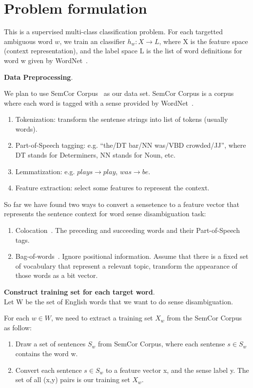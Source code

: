 \section{Problem formulation}

This is a supervised multi-class classification problem. For each targetted
ambiguous word $w$, we train an classifier $h_w: X \rightarrow L$, where X is
the feature space (context representation), and the label space L is the list of
word definitions for word w given by WordNet~\cite{wordnet}.

\textbf{Data Preprocessing}.

We plan to use SemCor Corpus~\cite{semcor} as our data set. SemCor Corpus is a
corpus where each word is tagged with a sense provided by WordNet~\cite{wordnet}.

\begin{enumerate}
  \item Tokenization: transform the sentense strings into list of tokens
    (usually words).
  \item Part-of-Speech tagging: e.g. ``the/DT bar/NN was/VBD crowded/JJ'', where
    DT stands for Determiners, NN stands for Noun, etc.
  \item Lemmatization: e.g. $plays \rightarrow play$, $was \rightarrow be$.
  \item Feature extraction: select some features to represent the context.
\end{enumerate}

So far we have found two ways to convert a
sensetence to a feature vector that represents the sentence context for word
sense disambiguation task:
\begin{enumerate}
  \item Colocation~\cite{colocation}. The preceding and succeeding words and
    their Part-of-Speech tags.
  \item Bag-of-words~\cite{bagofwords}. Ignore positional information. Assume
    that there is a fixed set of vocabulary that represent a relevant topic,
    transform the appearance of those words as a bit vector.
\end{enumerate}

\textbf{Construct training set for each target word}.\\
Let W be the set of English words that we want to do sense disambiguation. 

For each $w \in W$, we need to extract a training set $X_w$ from the SemCor
Corpus as follow: 
\begin{enumerate}
  \item Draw a set of sentences $S_w$ from SemCor Corpus, where each sentense
$s \in S_w$ contains the word w. 
  \item Convert each sentence $s \in S_w$ to a feature vector x, and the sense
    label y. The set of all (x,y) pairs is our training set $X_w$.
\end{enumerate}

